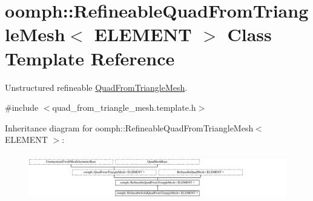 \hypertarget{classoomph_1_1RefineableQuadFromTriangleMesh}{}\section{oomph\+:\+:Refineable\+Quad\+From\+Triangle\+Mesh$<$ E\+L\+E\+M\+E\+NT $>$ Class Template Reference}
\label{classoomph_1_1RefineableQuadFromTriangleMesh}


Unstructured refineable \hyperlink{classoomph_1_1QuadFromTriangleMesh}{Quad\+From\+Triangle\+Mesh}.  




{\ttfamily \#include $<$quad\+\_\+from\+\_\+triangle\+\_\+mesh.\+template.\+h$>$}

Inheritance diagram for oomph\+:\+:Refineable\+Quad\+From\+Triangle\+Mesh$<$ E\+L\+E\+M\+E\+NT $>$\+:\begin{figure}[H]
\begin{center}
\leavevmode
\includegraphics[height=2.018018cm]{classoomph_1_1RefineableQuadFromTriangleMesh}
\end{center}
\end{figure}
